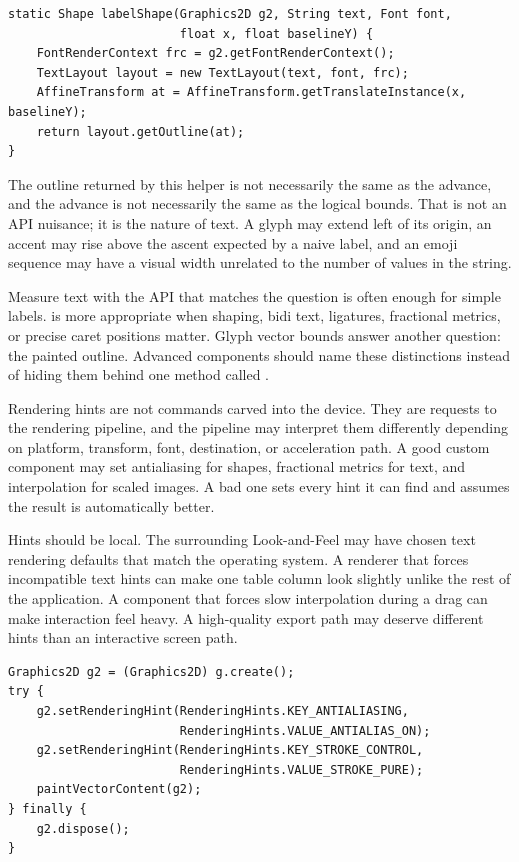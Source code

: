 \begin{lstlisting}[caption={Using TextLayout for precise label bounds.}]
static Shape labelShape(Graphics2D g2, String text, Font font,
                        float x, float baselineY) {
    FontRenderContext frc = g2.getFontRenderContext();
    TextLayout layout = new TextLayout(text, font, frc);
    AffineTransform at = AffineTransform.getTranslateInstance(x, baselineY);
    return layout.getOutline(at);
}
\end{lstlisting}

The outline returned by this helper is not necessarily the same as the advance, and the advance is not necessarily the same as the logical bounds. That is not an API nuisance; it is the nature of text. A glyph may extend left of its origin, an accent may rise above the ascent expected by a naive label, and an emoji sequence may have a visual width unrelated to the number of  values in the string.

\begin{detailbox}{Measure text with the API that matches the question}
 is often enough for simple labels.  is more appropriate when shaping, bidi text, ligatures, fractional metrics, or precise caret positions matter. Glyph vector bounds answer another question: the painted outline. Advanced components should name these distinctions instead of hiding them behind one method called .
\end{detailbox}

Rendering hints are not commands carved into the device. They are requests to the rendering pipeline, and the pipeline may interpret them differently depending on platform, transform, font, destination, or acceleration path. A good custom component may set antialiasing for shapes, fractional metrics for text, and interpolation for scaled images. A bad one sets every hint it can find and assumes the result is automatically better.

Hints should be local. The surrounding Look-and-Feel may have chosen text rendering defaults that match the operating system. A renderer that forces incompatible text hints can make one table column look slightly unlike the rest of the application. A component that forces slow interpolation during a drag can make interaction feel heavy. A high-quality export path may deserve different hints than an interactive screen path.

\begin{lstlisting}[caption={A conservative local hint block.}]
Graphics2D g2 = (Graphics2D) g.create();
try {
    g2.setRenderingHint(RenderingHints.KEY_ANTIALIASING,
                        RenderingHints.VALUE_ANTIALIAS_ON);
    g2.setRenderingHint(RenderingHints.KEY_STROKE_CONTROL,
                        RenderingHints.VALUE_STROKE_PURE);
    paintVectorContent(g2);
} finally {
    g2.dispose();
}
\end{lstlisting}

